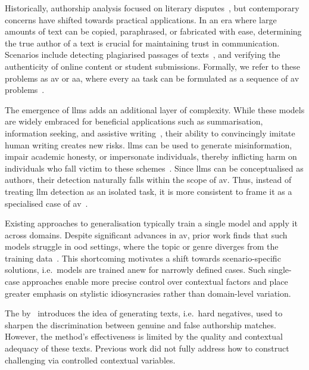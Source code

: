 Historically, authorship analysis focused on literary disputes~\citep{neal_surveying_2018,stamatatos_survey_2009}, but contemporary concerns have shifted towards practical applications.
In an era where large amounts of text can be copied, paraphrased, or fabricated with ease, determining the true author of a text is crucial for maintaining trust in communication. 
Scenarios include detecting plagiarised passages of texts~\citep{stein_intrinsic_2011}, and verifying the authenticity of online content or student submissions. 
Formally, we refer to these problems as \acf{av} or \acf{aa}, where every \ac{aa} task can be formulated as a sequence of \ac{av} problems~\citep{tyo_state_2022,barlas_cross_domain_2020}.

The emergence of \acp{llm} adds an additional layer of complexity. 
While these models are widely embraced for beneficial applications such as summarisation, information seeking, and assistive writing~\citep{wang_stumbling_2024}, their ability to convincingly imitate human writing creates new risks. 
\acp{llm} can be used to generate misinformation, impair academic honesty, or impersonate individuals, thereby inflicting harm on individuals who fall victim to these schemes~\citep{mitchell_detectgpt_2023,li_learning_2025,wang_stumbling_2024,bhattacharjee_fighting_2024}. 
Since \acp{llm} can be conceptualised as authors, their detection naturally falls within the scope of \ac{av}. 
Thus, instead of treating \ac{llm} detection as an isolated task, it is more consistent to frame it as a specialised case of \ac{av}~\citep{llm_detection_av_2025}.

Existing approaches to generalisation typically train a single model and apply it across domains.
Despite significant advances in \ac{av}, prior work finds that such models struggle in \ac{ood} settings, where the topic or genre diverges from the training data~\citep{Sundararajan_style_18,bischoff_importance_2020,li_learning_2025}. 
This shortcoming motivates a shift towards scenario-specific solutions, i.e.\ models are trained anew for narrowly defined cases. 
Such single-case approaches enable more precise control over contextual factors and place greater emphasis on stylistic idiosyncrasies rather than domain-level variation.

The \impAppr{} by \citet{koppel_determining_2014}\ introduces the idea of generating \imp{} texts, i.e.\ hard negatives, used to sharpen the discrimination between genuine and false authorship matches. 
However, the method's effectiveness is limited by the quality and contextual adequacy of these \imp{} texts. 
Previous work did not fully address how to construct challenging \imps{} via controlled contextual variables.

